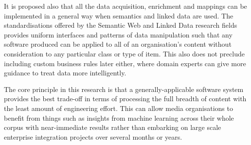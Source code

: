 It is proposed also that all the data acquisition, enrichment and
mappings can be implemented in a general way when semantics and
linked data are used. The standardisations offered by the Semantic
Web and Linked Data research fields provides uniform interfaces and
patterns of data manipulation such that any software produced can be
applied to all of an organisation's content without consideration to
any particular class or type of item. This also does not preclude
including custom business rules later either, where domain experts
can give more guidance to treat data more intelligently.

The core principle in this research is that a generally-applicable
software system provides the best trade-off in terms of processing
the full breadth of content with the least amount of engineering
effort. This can allow media organisations to benefit from things
such as insights from machine learning across their whole corpus with
near-immediate results rather than embarking on large scale enterprise
integration projects over several months or years.
